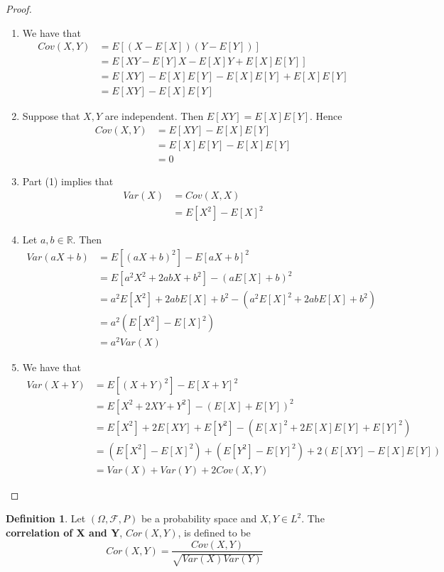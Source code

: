 \documentclass[12pt]{amsart}
\theoremstyle{definition}
\newtheorem{defn}[definition]{Definition}
\newcommand{\Om}{\Omega}
\newcommand{\R}{\mathbb{R}}
\newcommand{\MF}{\mathcal{F}}
\begin{document}
	\begin{proof}\
		\begin{enumerate}
			\item We have that
			\begin{align*}
				Cov(X,Y) 
				&= E[(X-E[X])(Y-E[Y])] \\
				&= E[XY -E[Y]X - E[X]Y + E[X]E[Y]] \\
				&= E[XY] - E[X]E[Y] - E[X]E[Y] + E[X]E[Y] \\ 
				&= E[XY] - E[X]E[Y]
			\end{align*}
			\item Suppose that $X,Y$ are independent. Then $E[XY] = E[X]E[Y]$. Hence 
			\begin{align*}
				Cov(X,Y) 
				&= E[XY] - E[X]E[Y] \\
				&= E[X]E[Y] - E[X]E[Y] \\
				&= 0
			\end{align*}
			\item Part (1) implies that 
			\begin{align*}
				Var(X) 
				&= Cov(X, X) \\
				&= E[X^2] -E[X]^2
			\end{align*}
			\item Let $a,b \in \R$. Then
			\begin{align*}
				Var(aX+b)
				&= E[(aX+b)^2] - E[aX+b]^2 \\
				&= E[a^2X^2 + 2abX +b^2] - (aE[X]+b)^2 \\
				&= a^2E[X^2]+2abE[X] + b^2 - (a^2E[X]^2 +2abE[X]+b^2) \\
				&= a^2(E[X^2]-E[X]^2) \\
				&= a^2Var(X)
			\end{align*} 
			\item We have that 
			\begin{align*}
				Var(X+Y) 
				&= E[(X+Y)^2] - E[X+Y]^2 \\
				&= E[X^2 +2XY + Y^2] -(E[X]+E[Y])^2 \\
				&= E[X^2] + 2E[XY] + E[Y^2] - (E[X]^2 + 2E[X]E[Y] + E[Y]^2) \\
				&= (E[X^2] - E[X]^2) + (E[Y^2]- E[Y]^2) + 2(E[XY] - E[X]E[Y]) \\
				&= Var(X) + Var(Y) + 2Cov(X,Y)
			\end{align*}
		\end{enumerate}
	\end{proof}
	
	\begin{defn}
		Let $(\Om, \MF, P)$ be a probability space and $X,Y \in L^2$. The \textbf{correlation of X and Y}, $Cor(X,Y)$, is defined to be $$Cor(X,Y) = \frac{Cov(X,Y)}{\sqrt{Var(X)Var(Y)}}$$
	\end{defn}
	
\end{document}
